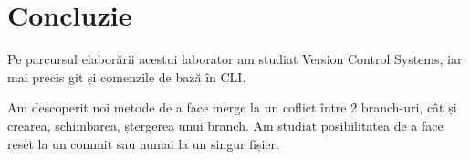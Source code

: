 \section*{Concluzie}

Pe parcursul elaborării acestui laborator am studiat Version Control Systems, iar mai precis git și comenzile de bază în CLI.

Am descoperit noi metode de a face merge la un coflict între 2 branch-uri, cât și crearea, schimbarea, ștergerea unui branch. Am studiat posibilitatea de a face reset la un commit sau numai la un singur fișier.

\clearpage